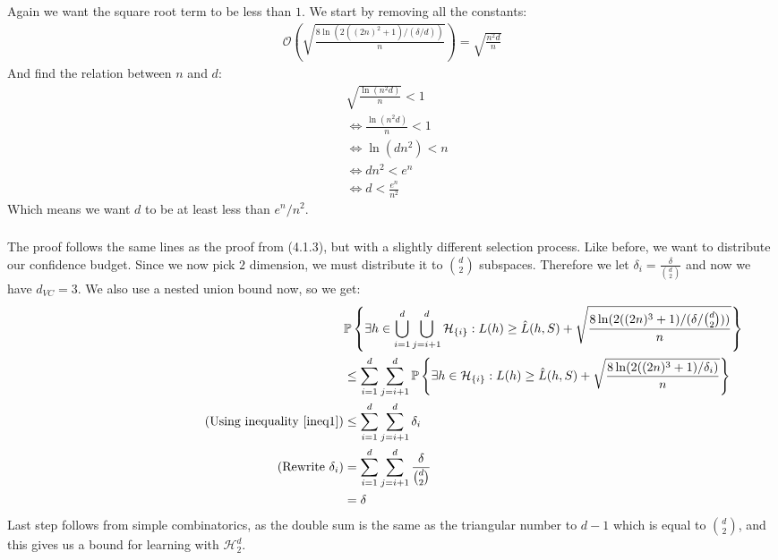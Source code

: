 \documentclass[a4paper]{article}
\newcommand{\comment}[1]{%
  \text{\phantom{(#1)}} \tag{#1}}
\begin{document}
\subsubsection{}
Again we want the square root term to be less than $1$. We start by removing all the constants:
\begin{align*}
  \mathcal{O}\left(\sqrt{\frac{8\ln(2((2n)^{2}+1)/(\delta/d))}{n}}\right) = \sqrt{\frac{n^2d}{n}}
\end{align*}
And find the relation between $n$ and $d$:
\begin{align*}
  &\sqrt{\frac{\ln (n^2d)}{n}} < 1 \\
  &\Leftrightarrow \frac{\ln(n^2d)}{n} < 1 \\
  &\Leftrightarrow \ln(dn^2) < n \\
  &\Leftrightarrow dn^2 < e^n \\
  &\Leftrightarrow d < \frac{e^n}{n^2}
\end{align*}
Which means we want $d$ to be at least less than $e^n/n^2$.

\subsubsection{}
The proof follows the same lines as the proof from (4.1.3), but with a slightly different selection process. Like before, we want to distribute our confidence budget. Since we now pick $2$ dimension, we must distribute it to $\binom{d}{2}$ subspaces. Therefore we let $\delta_i=\frac{\delta}{\binom{d}{2}}$ and now we have $d_{VC}=3$. We also use a nested union bound now, so we get:
\begin{align*}
  &\mathbb{P}\left\{ \exists h \in \bigcup_{i=1}^d \bigcup_{j=i+1}^d \mathcal{H}_{\{i\}} : L(h)\geq \hat{L}(h, S)+\sqrt{\frac{8\ln(2((2n)^{3}+1)/(\delta/\binom{d}{2}))}{n}}\right\} \\
  &\leq \sum_{i=1}^d \sum_{j=i+1}^d \mathbb{P}\left\{ \exists h \in \mathcal{H}_{\{i\}} : L(h)\geq \hat{L}(h, S)+\sqrt{\frac{8\ln(2((2n)^{3}+1)/\delta_i)}{n}}\right\} \\
  \comment{Using inequality \ref{ineq1}} &\leq \sum_{i=1}^d\sum_{j=i+1}^d \delta_i \\
  \comment{Rewrite $\delta_i$} &=\sum_{i=1}^d \sum_{j=i+1}^d\frac{\delta}{\binom{d}{2}} \\
                               &= \delta
\end{align*}
Last step follows from simple combinatorics, as the double sum is the same as the triangular number to $d-1$ which is equal to $\binom{d}{2}$, and this gives us a bound for learning with $\mathcal{H}_2^d$.
\end{document}
